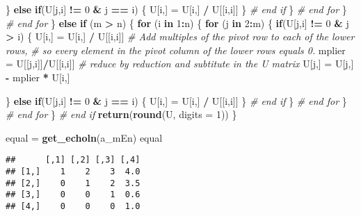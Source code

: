 \documentclass[]{article}
\newenvironment{Shaded}{\begin{snugshade}}{\end{snugshade}}
\newcommand{\CommentTok}[1]{\textcolor[rgb]{0.56,0.35,0.01}{\textit{#1}}}
\newcommand{\ControlFlowTok}[1]{\textcolor[rgb]{0.13,0.29,0.53}{\textbf{#1}}}
\newcommand{\DataTypeTok}[1]{\textcolor[rgb]{0.13,0.29,0.53}{#1}}
\newcommand{\DecValTok}[1]{\textcolor[rgb]{0.00,0.00,0.81}{#1}}
\newcommand{\KeywordTok}[1]{\textcolor[rgb]{0.13,0.29,0.53}{\textbf{#1}}}
\newcommand{\NormalTok}[1]{#1}
\newcommand{\OperatorTok}[1]{\textcolor[rgb]{0.81,0.36,0.00}{\textbf{#1}}}
\newcommand{\StringTok}[1]{\textcolor[rgb]{0.31,0.60,0.02}{#1}}
\begin{document}
\begin{Shaded}
\begin{Highlighting}[]
\NormalTok{        \} }\ControlFlowTok{else} \ControlFlowTok{if}\NormalTok{(U[j,i] }\OperatorTok{!=}\StringTok{ }\DecValTok{0} \OperatorTok{&}\StringTok{ }\NormalTok{j }\OperatorTok{==}\StringTok{ }\NormalTok{i) \{}
\NormalTok{          U[i,] =}\StringTok{ }\NormalTok{U[i,] }\OperatorTok{/}\StringTok{ }\NormalTok{U[[i,i]]}
\NormalTok{        \} }\CommentTok{# end if}
\NormalTok{      \} }\CommentTok{# end for}
\NormalTok{    \} }\CommentTok{# end for}
\NormalTok{  \} }\ControlFlowTok{else} \ControlFlowTok{if}\NormalTok{ (m }\OperatorTok{>}\StringTok{ }\NormalTok{n) \{}
    \ControlFlowTok{for}\NormalTok{ (i }\ControlFlowTok{in} \DecValTok{1}\OperatorTok{:}\NormalTok{n) \{}
      \ControlFlowTok{for}\NormalTok{ (j }\ControlFlowTok{in} \DecValTok{2}\OperatorTok{:}\NormalTok{m) \{}
        \ControlFlowTok{if}\NormalTok{(U[j,i] }\OperatorTok{!=}\StringTok{ }\DecValTok{0} \OperatorTok{&}\StringTok{ }\NormalTok{j }\OperatorTok{>}\StringTok{ }\NormalTok{i) \{}
\NormalTok{          U[i,] =}\StringTok{ }\NormalTok{U[i,] }\OperatorTok{/}\StringTok{ }\NormalTok{U[[i,i]]}
          \CommentTok{# Add multiples of the pivot row to each of the lower rows, }
          \CommentTok{# so every element in the pivot column of the lower rows equals 0.}
\NormalTok{          mplier =}\StringTok{ }\NormalTok{U[[j,i]]}\OperatorTok{/}\NormalTok{U[[i,i]]}
          \CommentTok{# reduce by reduction and subtitute in the U matrix}
\NormalTok{          U[j,] =}\StringTok{ }\NormalTok{U[j,] }\OperatorTok{-}\StringTok{ }\NormalTok{mplier }\OperatorTok{*}\StringTok{ }\NormalTok{U[i,]}
          
\NormalTok{        \} }\ControlFlowTok{else} \ControlFlowTok{if}\NormalTok{(U[j,i] }\OperatorTok{!=}\StringTok{ }\DecValTok{0} \OperatorTok{&}\StringTok{ }\NormalTok{j }\OperatorTok{==}\StringTok{ }\NormalTok{i) \{}
\NormalTok{          U[i,] =}\StringTok{ }\NormalTok{U[i,] }\OperatorTok{/}\StringTok{ }\NormalTok{U[[i,i]]}
\NormalTok{        \} }\CommentTok{# end if}
\NormalTok{      \} }\CommentTok{# end for}
\NormalTok{    \} }\CommentTok{# end for}
\NormalTok{  \} }\CommentTok{# end if }
  \KeywordTok{return}\NormalTok{(}\KeywordTok{round}\NormalTok{(U, }\DataTypeTok{digits =} \DecValTok{1}\NormalTok{))}
\NormalTok{\}}

\NormalTok{equal =}\StringTok{ }\KeywordTok{get_echoln}\NormalTok{(a_mEn)}
\NormalTok{equal}
\end{Highlighting}
\end{Shaded}

\begin{verbatim}
##      [,1] [,2] [,3] [,4]
## [1,]    1    2    3  4.0
## [2,]    0    1    2  3.5
## [3,]    0    0    1  0.6
## [4,]    0    0    0  1.0
\end{verbatim}
\end{document}

